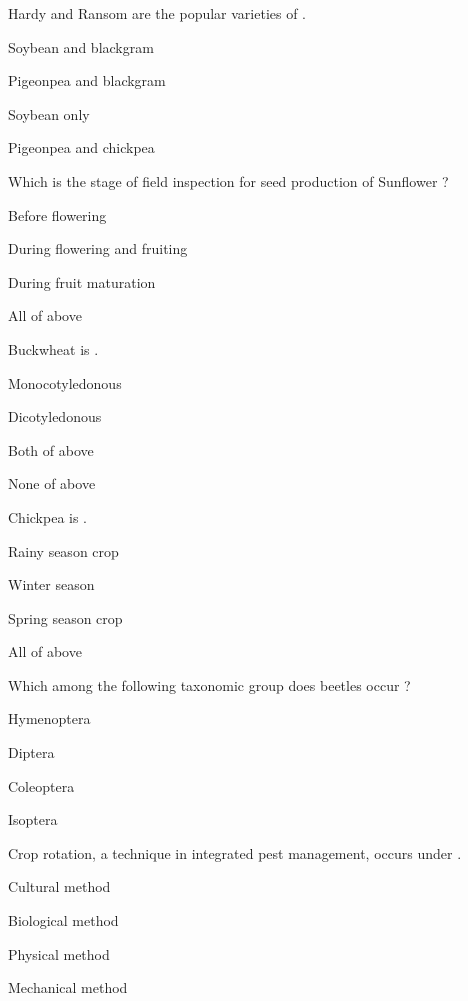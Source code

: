 \begin{questions}
\question Hardy and Ransom are the popular varieties of \fillin[][3cm].
\begin{items}
\item Soybean and blackgram
\item Pigeonpea and blackgram
\item* Soybean only
\item Pigeonpea and chickpea
\end{items}

\question Which is the stage of field inspection for seed production of Sunflower ?
\begin{items}
\item Before flowering
\item During flowering and fruiting
\item During fruit maturation
\item* All of above
\end{items}

\question Buckwheat is \fillin[][3cm].
\begin{items}
\item Monocotyledonous
\item* Dicotyledonous
\item Both of above
\item None of above
\end{items}

\question Chickpea is \fillin[][3cm].
\begin{items}
\item Rainy season crop
\item* Winter season
\item Spring season crop
\item All of above
\end{items}

\question Which among the following taxonomic group does beetles occur ?
\begin{items}
\item Hymenoptera
\item Diptera
\item* Coleoptera
\item Isoptera
\end{items}

\question Crop rotation, a technique in integrated pest management, occurs under \fillin[][3cm].
\begin{items}
\item* Cultural method
\item Biological method
\item Physical method
\item Mechanical method
\end{items}


\end{questions}
